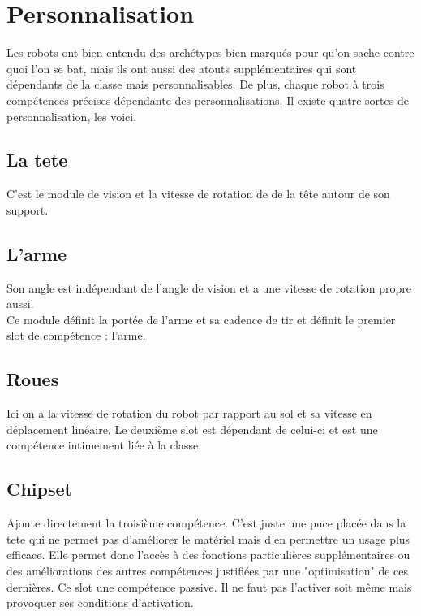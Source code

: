 \documentclass[10pt]{article}
\begin{document}
\setcounter{subsection}{0}
\section{Personnalisation}

Les robots ont bien entendu des archétypes bien marqués pour qu'on sache contre quoi l'on se bat, mais ils ont aussi des atouts supplémentaires qui sont dépendants de la classe mais personnalisables. De plus, chaque robot à trois compétences précises dépendante des personnalisations. Il existe quatre sortes de personnalisation, les voici.

\subsection{La tete}

C'est le module de vision et la vitesse de rotation de de la tête autour de son support.


\subsection{L'arme}

Son angle est indépendant de l'angle de vision et a une vitesse de rotation propre aussi. \\
Ce module définit la portée de l'arme et sa cadence de tir et définit le premier slot de compétence : l'arme.

\subsection{Roues}

Ici on a la vitesse de rotation du robot par rapport au sol et sa vitesse en déplacement linéaire.
Le deuxième slot est dépendant de celui-ci et est une compétence intimement liée à la classe.

\subsection{Chipset}

Ajoute directement la troisième compétence. C'est juste une puce placée dans la tete qui ne permet pas d'améliorer le matériel mais d'en permettre un usage plus efficace. Elle permet donc l'accès à des fonctions particulières supplémentaires ou des améliorations des autres compétences justifiées par une "optimisation" de ces dernières. Ce slot une compétence passive. Il ne faut pas l'activer soit même mais provoquer ses conditions d'activation.
\newpage
\end{document}
